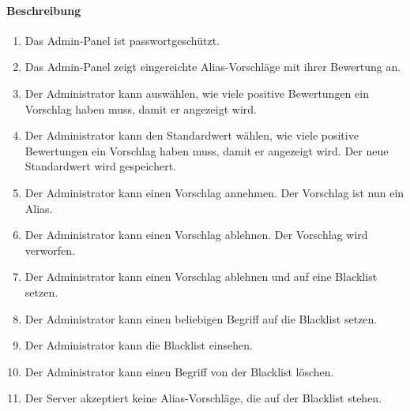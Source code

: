 \paragraph{Beschreibung}
\begin{enumerate}[start=100, label=\textbf{/FA\arabic*/}, align=left]
    \item Das Admin-Panel ist passwortgeschützt.
    \item Das Admin-Panel zeigt eingereichte Alias-Vorschläge mit ihrer Bewertung an.
    \item Der Administrator kann auswählen, wie viele positive Bewertungen ein Vorschlag haben muss, damit er angezeigt wird.
    \item Der Administrator kann den Standardwert wählen, wie viele positive Bewertungen ein Vorschlag haben muss, damit er angezeigt wird. Der neue Standardwert wird gespeichert.
    \item Der Administrator kann einen Vorschlag annehmen. Der Vorschlag ist nun ein Alias.
    \item Der Administrator kann einen Vorschlag ablehnen. Der Vorschlag wird verworfen.
    \item Der Administrator kann einen Vorschlag ablehnen und auf eine Blacklist setzen.
    \item Der Administrator kann einen beliebigen Begriff auf die Blacklist setzen.
    \item Der Administrator kann die Blacklist einsehen.
    \item Der Administrator kann einen Begriff von der Blacklist löschen.
    \item Der Server akzeptiert keine Alias-Vorschläge, die auf der Blacklist stehen.
\end{enumerate}